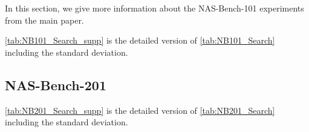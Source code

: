 \documentclass[runningheads]{llncs}
\begin{document}
In this section, we give more information about the NAS-Bench-101 experiments from the main paper. 

\autoref{tab:NB101_Search_supp} is the detailed version of \autoref{tab:NB101_Search} including the standard deviation.





\subsection{NAS-Bench-201}

\autoref{tab:NB201_Search_supp} is the detailed version of \autoref{tab:NB201_Search} including the standard deviation.


\begin{table*}[ht]
	\scriptsize
	\caption{Architecture Search on NAS-Bench-201. We report the mean and standard deviation over 10 trials for the search of the architecture with the highest validation accuracy.
		For comparable numbers of queries, AG-Net performs similarly or better than the previous state of the art.}
	\label{tab:NB201_Search_supp}
	\begin{center}
\end{center}
\end{table*}
\end{document}
